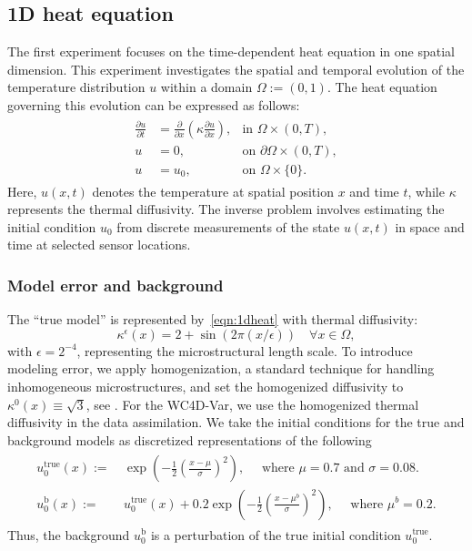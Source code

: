 \documentclass{aims} %
\theoremstyle{definition}
\begin{document}
\subsection{1D heat equation}\label{sec:1d_problem} 
The first experiment focuses on the time-dependent heat equation in one spatial dimension. This experiment investigates the spatial and temporal evolution of the temperature distribution $u$ within a domain $\Omega:=(0,1)$. The heat equation governing this evolution can be expressed as follows:
%
\begin{align}\label{eqn:1dheat}
\begin{aligned}
\frac{\partial u}{\partial t} &= 
\frac{\partial}{\partial x}  \left({\kappa} \frac{\partial u}{\partial x}   \right), & \text{in } \Omega \times (0, T), \\
u &= 0, & \text{on } \partial \Omega \times (0, T), \\
u &= u_0, & \text{on } \Omega \times \{0\}.
\end{aligned}
\end{align}
%
Here, $u(x, t)$ denotes the temperature at spatial position $x$ and time $t$, while ${\kappa}$ represents the thermal diffusivity.  
The inverse problem involves estimating the initial condition $u_0$ from discrete measurements of the state $u(x,t)$ in space and time at selected sensor locations.   
%
\subsubsection*{Model error and background}

The ``true model'' is represented by~\eqref{eqn:1dheat} with thermal diffusivity:
\[{\kappa}^\epsilon ({x}) = 2 + \sin\left({2\pi (x/ \epsilon)}\right) \quad \forall x \in \Omega,
\]
with $\epsilon = 2^{-4}$, representing the microstructural length scale.  To introduce modeling error, we apply homogenization, a standard technique for handling inhomogeneous microstructures, and set the homogenized diffusivity to  ${\kappa}^0(x) \equiv \sqrt{3}$, see  \cite{ALEXANDERIAN_HOMOGENIZATION, bensoussan1978asymptotic}. For the WC4D-Var, we use the homogenized thermal diffusivity in the data assimilation. We take  the  initial conditions  for the true and background models as discretized representations of the following
\begin{align}
\begin{aligned}
    u_0^{\text{true}}(x)  := & \> \exp\left(-\frac{1}{2}\left(\frac{x - \mu}{\sigma}\right)^2\right), \quad \mbox{ where } \mu = 0.7 \mbox{ and } \sigma = 0.08.  \\
    u_0^{\text{b}}(x)  := & \> u_0^{\text{true}}(x) + 0.2\exp\left(-\frac{1}{2}\left(\frac{x - \mu^b}{\sigma}\right)^2\right), \quad \mbox{ where } \mu^b = 0.2.  
\end{aligned}    
\end{align}
%
Thus, the background $u_0^{\text{b}}$ is a perturbation of the true initial condition $u_0^{\text{true}}$.
\end{document}
